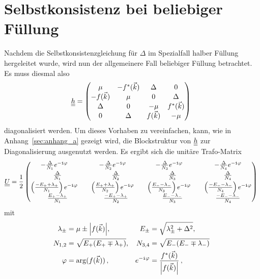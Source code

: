 

\section{Selbstkonsistenz bei beliebiger Füllung}

Nachdem die Selbstkonsistenzgleichung für $\Delta$ im Spezialfall halber Füllung hergeleitet wurde, wird nun der allgemeinere Fall beliebiger Füllung betrachtet.
Es muss diesmal also 
\begin{align}
    \underline{\underline{h}} = \begin{pmatrix} \mu & -f^*({\vec{k}}) & \Delta & 0 \\ -f({\vec{k}}) & \mu & 0 & \Delta \\ \Delta & 0 & -\mu & f^*({\vec{k}}) \\ 0 & \Delta & f({\vec{k}}) & -\mu \end{pmatrix}~\label{eq:h_nothalf}
\end{align}
diagonalisiert werden.
Um dieses Vorhaben zu vereinfachen, kann, wie in Anhang~\ref{sec:anhang_a} gezeigt wird, die Blockstruktur von $\underline{\underline{h}}$ zur Diagonalisierung ausgenutzt werden.
Es ergibt sich die unitäre Trafo-Matrix 
\begin{align}
    \underline{\underline{U}} = \frac{1}{2} \begin{pmatrix}
        -\frac{\Delta}{N_1} e^{-\texttt{i} \varphi} \quad & -\frac{\Delta}{N_2} e^{-\texttt{i} \varphi} \quad & -\frac{\Delta}{N_3} e^{-\texttt{i} \varphi} \quad & -\frac{\Delta}{N_4} e^{-\texttt{i} \varphi} \\[0.3em]
        \frac{\Delta}{N_1} & \frac{\Delta}{N_2} & \frac{\Delta}{N_3} & \frac{\Delta}{N_4} \\[0.3em]
        \left(\frac{-E_+ + \lambda_+}{N_1}\right)e^{-\texttt{i} \varphi} \quad & \left(\frac{E_+ + \lambda_+}{N_2}\right)e^{-\texttt{i} \varphi} \quad & \left(\frac{E_- - \lambda_-}{N_3}\right)e^{-\texttt{i} \varphi} \quad & \left(\frac{-E_- - \lambda_-}{N_4}\right)e^{-\texttt{i} \varphi} \\[0.3em]
        \frac{E_+ - \lambda_+}{N_1} & \frac{-E_+ - \lambda_+}{N_2} & \frac{E_- - \lambda_-}{N_3} & \frac{-E_- - \lambda_-}{N_4}
    \end{pmatrix}~\label{eq:U_nothalf}
\end{align}
mit 
\begin{align}
    \lambda_\pm &= \mu \pm \abs{f({\vec{k}})}, & E_\pm &= \sqrt{\lambda_{\pm}^2 + \Delta^2}, \\
    N_{1,2} &= \sqrt{E_+(E_+ \mp \lambda_+)}, & N_{3,4} &= \sqrt{E_-(E_- \mp \lambda_-)} \, \\
    \varphi &= \arg(f({\vec{k}})) \, , & e^{-\texttt{i} \varphi} &= \frac{f^*({\vec{k}})}{\abs{f({\vec{k}})}} \, ,
\end{align}
